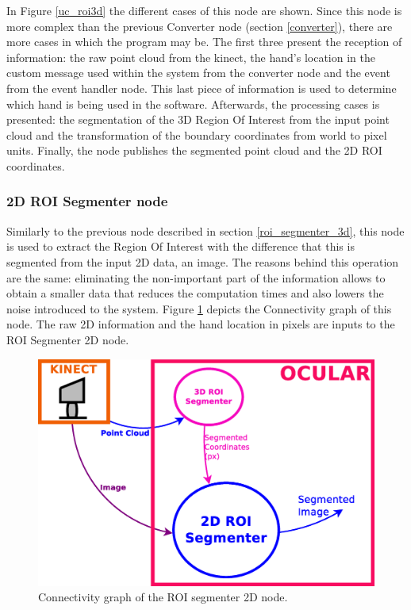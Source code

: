 	In Figure \ref{uc_roi3d} the different cases of this node are shown. 
	Since this node is more complex than the previous Converter node (section \ref{converter}), there are more cases in which the program may be. 
	The first three present the reception of information: the raw point cloud from the kinect, the hand's location in the custom message used within the system from the converter node and the event from the event handler node. 
	This last piece of information is used to determine which hand is being used in the software. 
	Afterwards, the processing cases is presented: the segmentation of the 3D Region Of Interest from the input point cloud and the transformation of the boundary coordinates from world to pixel units. 
	Finally, the node publishes the segmented point cloud and the 2D ROI coordinates. 

\subsubsection{2D ROI Segmenter node}
	\label{roi_segmenter_2d}
	
	Similarly to the previous node described in section \ref{roi_segmenter_3d}, this node is used to extract the Region Of Interest with the difference that this is segmented from the input 2D data, an image. 
	The reasons behind this operation are the same: eliminating the non-important part of the information allows to obtain a smaller data that reduces the computation times and also lowers the noise introduced to the system. 
	Figure \ref{node_roi2d} depicts the Connectivity graph of this node. 
	The raw 2D information and the hand location in pixels are inputs to the ROI Segmenter 2D node. 

		\begin{figure}[H]
			\begin{center}
			\includegraphics[width=0.5\linewidth]{img/diagrams/node_roi2d.eps}
			\caption[ROI segmenter 2D node I/O]{Connectivity graph of the ROI segmenter 2D node.}		
			\label{node_roi2d}
			\end{center}
		\end{figure}

